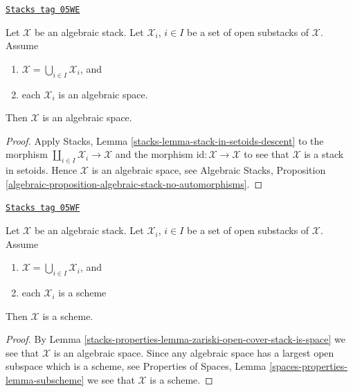 \begin{lemma}
\label{stacks-properties-lemma-zariski-open-cover-stack-is-space}
\href{https://stacks.math.columbia.edu/tag/05WE}{\texttt{Stacks tag 05WE}}

Let $\mathcal X$ be an algebraic stack.
Let $\mathcal{X}_i$, $i \in I$ be a set of open substacks of $\mathcal{X}$.
Assume
\begin{enumerate}
\item $\mathcal{X} = \bigcup_{i \in I} \mathcal{X}_i$, and
\item each $\mathcal{X}_i$ is an algebraic space.
\end{enumerate}
Then $\mathcal{X}$ is an algebraic space.
\end{lemma}

\begin{proof}
Apply
Stacks, Lemma \ref{stacks-lemma-stack-in-setoids-descent}
to the morphism $\coprod_{i \in I} \mathcal{X}_i \to \mathcal{X}$
and the morphism $\text{id} : \mathcal{X} \to \mathcal{X}$ to
see that $\mathcal{X}$ is a stack in setoids.
Hence $\mathcal{X}$ is an algebraic space, see
Algebraic Stacks,
Proposition \ref{algebraic-proposition-algebraic-stack-no-automorphisms}.
\end{proof}

\begin{lemma}
\label{stacks-properties-lemma-zariski-open-cover-stack-is-scheme}
\href{https://stacks.math.columbia.edu/tag/05WF}{\texttt{Stacks tag 05WF}}

Let $\mathcal X$ be an algebraic stack.
Let $\mathcal{X}_i$, $i \in I$ be a set of open substacks of $\mathcal{X}$.
Assume
\begin{enumerate}
\item $\mathcal{X} = \bigcup_{i \in I} \mathcal{X}_i$, and
\item each $\mathcal{X}_i$ is a scheme
\end{enumerate}
Then $\mathcal{X}$ is a scheme.
\end{lemma}

\begin{proof}
By
Lemma \ref{stacks-properties-lemma-zariski-open-cover-stack-is-space}
we see that $\mathcal{X}$ is an algebraic space. Since any algebraic
space has a largest open subspace which is a scheme, see
Properties of Spaces, Lemma \ref{spaces-properties-lemma-subscheme}
we see that $\mathcal{X}$ is a scheme.
\end{proof}


